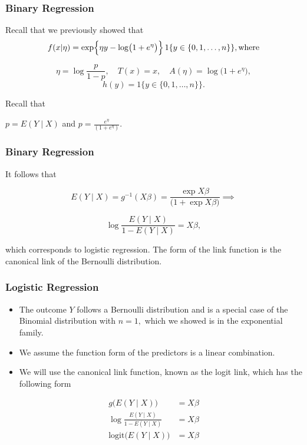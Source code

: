 \documentclass{beamer}
\begin{document}
\begin{frame}
\frametitle{Binary Regression}
Recall that we previously showed that
\[
f(x|\eta) = \exp\Bigl\{\eta y - \log\bigl(1+e^\eta\bigr)\Bigr\}\, 1\{y \in \{0,1,\dots,n\}\}, \text{where} 
\]

$$
\eta = \log\frac{p}{1-p}, \quad T(x)=x,\quad A(\eta)= \log\bigl(1+e^\eta\bigr),$$
$$h(y)= 1\{y \in \{0,1,\dots,n\}\}.$$

\vspace*{1em}

Recall that

$p = E(Y \mid X)$ and $p = \frac{e^{\eta}}{(1 + e^{\eta})}.$
\end{frame}

\begin{frame}
\frametitle{Binary Regression}

It follows that 

$$ E(Y \mid X) = g^{-1}(X \beta) = \frac{\exp{X \beta}}{(1 + \exp{X \beta)}} \implies$$

$$ \log \frac{E(Y \mid X)}{1 - E(Y \mid X)} = X\beta,$$

which corresponds to logistic regression. The form of the link function is the canonical link of the Bernoulli distribution. 

\end{frame}

\begin{frame}
\frametitle{Logistic Regression}

\begin{itemize}
\item The outcome $Y$ follows a Bernoulli distribution and is a special case of the Binomial distribution with $n=1,$ which we showed is in the exponential family.
\item We assume the function form of the predictors is a linear combination. 
\item We will use the canonical link function, known as the logit link, which has the following form
\end{itemize}

\begin{align}
g \Big( E(Y \mid X) \Big) &= X \beta \\
\log \frac{E(Y \mid X)}{1 - E(Y \mid X)} &= X\beta \\
 \text{logit} \Big( E(Y \mid X) \Big) &= X \beta
\end{align}

\end{frame}
\end{document}
